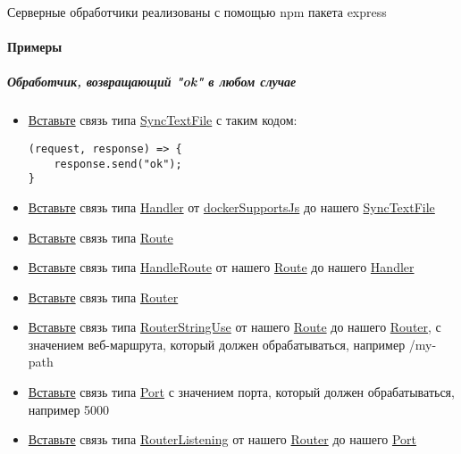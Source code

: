 \documentclass{article}
\begin{document}
Серверные обработчики реализованы с помощью npm пакета express
\paragraph{Примеры}
\subparagraph{Обработчик, возвращающий "ok" в любом случае}
\begin{itemize}
      \item \hyperlink{DeepCase.InsertLink.Description}{Вставьте} связь типа
            \hyperlink{Core.SyncTextFile.Description}{SyncTextFile} с таким
            кодом:
            \begin{lstlisting}
(request, response) => {
    response.send("ok");
}
\end{lstlisting}
      \item \hyperlink{DeepCase.InsertLink.Description}{Вставьте} связь типа
            \hyperlink{Core.Handler.Description}{Handler} от
            \hyperlink{Core.dockerSupportsJs.Description}{dockerSupportsJs}
            до нашего \hyperlink{Core.SyncTextFile.Description}{SyncTextFile}
      \item \hyperlink{DeepCase.InsertLink.Description}{Вставьте} связь типа
            \hyperlink{Core.Route.Description}{Route}
      \item \hyperlink{DeepCase.InsertLink.Description}{Вставьте} связь типа
            \hyperlink{Core.HandleRoute.Description}{HandleRoute} от нашего
            \hyperlink{Core.Route.Description}{Route} до нашего
            \hyperlink{Core.Handler.Description}{Handler}
      \item \hyperlink{DeepCase.InsertLink.Description}{Вставьте} связь типа
            \hyperlink{Core.Router.Description}{Router}
      \item \hyperlink{DeepCase.InsertLink.Description}{Вставьте} связь типа
            \hyperlink{Core.RouterStringUse.Description}{RouterStringUse} от
            нашего
            \hyperlink{Core.Route.Description}{Route} до нашего
            \hyperlink{Core.Router.Description}{Router},
            с
            значением
            веб-маршрута, который должен обрабатываться, например /my-path
      \item \hyperlink{DeepCase.InsertLink.Description}{Вставьте} связь типа
            \hyperlink{Core.Port.Description}{Port} с значением порта, который
            должен
            обрабатываться, например
            5000
      \item \hyperlink{DeepCase.InsertLink.Description}{Вставьте} связь типа
            \hyperlink{Core.RouterListening.Description}{RouterListening} от
            нашего
            \hyperlink{Core.Router.Description}{Router} до нашего
            \hyperlink{Core.Port.Description}{Port}
\end{itemize}
\end{document}
